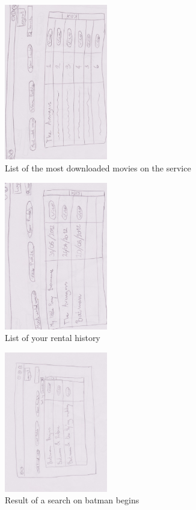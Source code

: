 \begin{figure}[!ht]
  \centering
    \includegraphics[angle=90, width=0.4\textwidth]{Parts/Appendix/Images/PaperMockup/MostDownloaded}
  \caption{List of the most downloaded movies on the service}
  \label{fig:Appendix_GUI_sketches_MostDownloaded}
\end{figure}
\begin{figure}[!ht]
  \centering
    \includegraphics[angle=90, width=0.4\textwidth]{Parts/Appendix/Images/PaperMockup/RentalHistory}
  \caption{List of your rental history}
  \label{fig:Appendix_GUI_sketches_RentalHistory}
\end{figure}
\begin{figure}[!ht]
  \centering
    \includegraphics[angle=90, width=0.4\textwidth]{Parts/Appendix/Images/PaperMockup/Search}
  \caption{Result of a search on batman begins}
  \label{fig:Appendix_GUI_sketches_Search}
\end{figure}
